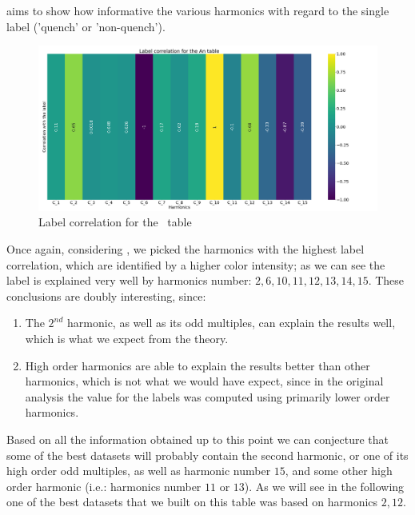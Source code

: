  aims to show how informative the various harmonics with regard to the single
label ('quench' or 'non-quench').

\begin{figure}
	\centering
	\includegraphics[width=\linewidth]{img/An_label_corr.png}
	\caption{Label correlation for the \an\ table} \label{fig:an-lcorr}
\end{figure}

Once again, considering , we picked the harmonics with the highest label
correlation, which are identified by a higher color intensity; as we can see the label is explained
very well by harmonics number: $2, 6, 10, 11, 12, 13, 14, 15$.
These conclusions are doubly interesting, since:
\begin{enumerate}
	\item The $2^{nd}$ harmonic, as well as its odd multiples, can explain the results well, which
	      is what we expect from the theory.
	\item High order harmonics are able to explain the results better than other harmonics,
	      which is not what we would have expect, since in the original analysis the value for the
	      labels was computed using primarily lower order harmonics.
\end{enumerate}

Based on all the information obtained up to this point we can conjecture that some of the best
datasets will probably contain the second harmonic, or one of its high order odd multiples, as well
as harmonic number $15$, and some other high order harmonic (i.e.: harmonics number $11$ or $13$). As we will see
in the following one of the best datasets that we built on this table was based on harmonics $2, 12$.

